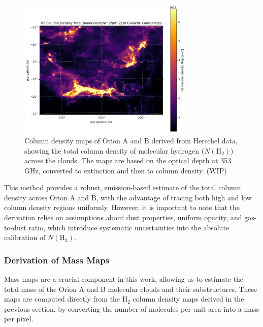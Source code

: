\begin{figure}[t]
    \centering
    \includegraphics[width=0.75\textwidth]{figures/column_density_map.png}
    \caption{Column density maps of Orion A and B derived from Herschel data, showing the total column density of molecular hydrogen ($N(\mathrm{H}_2)$) across the clouds. The maps are based on the optical depth at 353 GHz, converted to extinction and then to column density. (WIP)}
    \label{fig:n_h2_final_map}
\end{figure}

This method provides a robust, emission-based estimate of the total column density across Orion A and B, with the advantage of tracing both high and low column density regions uniformly. 
However, it is important to note that the derivation relies on assumptions about dust properties, uniform opacity, and gas-to-dust ratio, which introduce systematic uncertainties into the absolute calibration of $N(\mathrm{H}_2)$.



\subsubsection{Derivation of Mass Maps}

Mass maps are a crucial component in this work, allowing us to estimate the total mass of the Orion A and B molecular clouds and their substructures. These maps are computed directly from the H$_2$ column density maps derived in the previous section, by converting the number of molecules per unit area into a mass per pixel.

